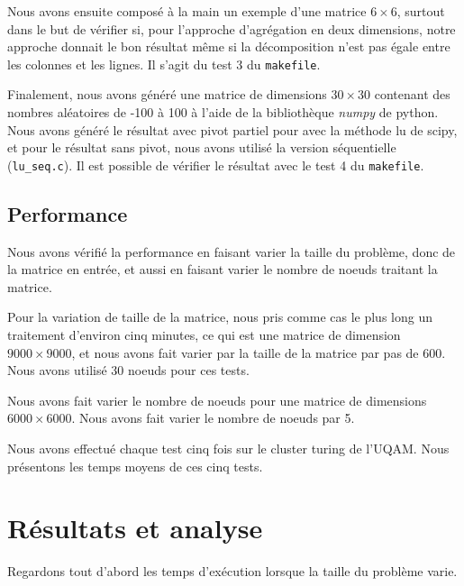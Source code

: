 \documentclass[12pt,letterpaper]{article} %
\begin{document}
Nous avons ensuite composé à la main un exemple d'une matrice $6 \times 6$, surtout dans le but
de vérifier si, pour l'approche d'agrégation en deux dimensions, notre approche donnait le
bon résultat même si la décomposition n'est pas égale entre les colonnes et les lignes. Il 
s'agit du test 3 du \texttt{makefile}.

Finalement, nous avons généré une matrice de dimensions $30 \times 30$ contenant des
nombres aléatoires de -100 à 100 à l'aide de la bibliothèque \emph{numpy} de python. Nous avons
généré le résultat avec pivot partiel pour avec la méthode lu de scipy, et pour le résultat
sans pivot, nous avons utilisé la version séquentielle (\texttt{lu\_seq.c}). Il est possible
de vérifier le résultat avec le test 4 du \texttt{makefile}.

\subsection{Performance}

Nous avons vérifié la performance en faisant varier la taille du problème, donc de la
matrice en entrée, et aussi en faisant varier le nombre de noeuds traitant la matrice.

Pour la variation de taille de la matrice, nous pris comme cas le plus long un traitement
d'environ cinq minutes, ce qui est une matrice de dimension $9000 \times 9000$, et nous 
avons fait varier par la taille de la matrice par pas de 600. Nous avons utilisé 30 noeuds
pour ces tests.

Nous avons fait varier le nombre de noeuds pour une matrice de dimensions $6000 \times 6000$.
Nous avons fait varier le nombre de noeuds par 5. 

Nous avons effectué chaque test cinq fois sur le cluster turing de l'UQAM. Nous présentons
les temps moyens de ces cinq tests.

\section{Résultats et analyse}

Regardons tout d'abord les temps d'exécution lorsque la taille du problème varie.
\end{document}

